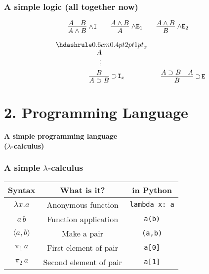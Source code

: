 \documentclass{beamer}
\newcommand{\impl}{\supset}
\newcommand{\wedgeI}{\!\wedge\rn{I}}
\newcommand{\wedgeE}{\!\wedge\rn{E}}
\newcommand{\implI}{\!\impl\!\rn{I}}
\newcommand{\implE}{\!\impl\!\rn{E}}
\begin{document}

\begin{frame}
  \frametitle{A simple logic (all together now)}
  \[
  \infer[\wedgeI]{A \wedge B}{A & B}
  \qquad
  \infer[\wedgeE_1]{A}{A \wedge B}
  \qquad
  \infer[\wedgeE_2]{B}{A \wedge B}
  \]

  \[
  \infer[\implI_x]{A \impl B}{
    \deduce[\ ^{\vdots}]{B}{\hyp{x}{A}}}
  \qquad
  \infer[\implE]{B}{A \impl B & A}
  \]
\end{frame}


\section{2. Programming Language}

\begin{frame}
  \begin{center}
    {\Large \bf A simple programming language \\
    ($\lambda$-calculus)}
  \end{center}
\end{frame}

\newcommand{\pair}[2]{\langle{#1},{#2}\rangle}
\newcommand{\projl}{\pi_1\,}
\newcommand{\projr}{\pi_2\,}

\begin{frame}
  \frametitle{A simple $\lambda$-calculus}
  \begin{center}
    \begin{tabular}{ccc}
      Syntax & What is it? & in Python\\
      \hline
      $\lambda x. a$
      & Anonymous function
      & \texttt{lambda\ x:\ a}\\
      $a\,b$
      & Function application
      & \texttt{a(b)}\\
      $\pair{a}{b}$ & Make a pair & \texttt{(a,b)}\\
      $\projl a$ & First element of pair & \texttt{a[0]}\\
      $\projr a$ & Second element of pair & \texttt{a[1]}\\
    \end{tabular}
  \end{center}
\end{frame}
\end{document}
